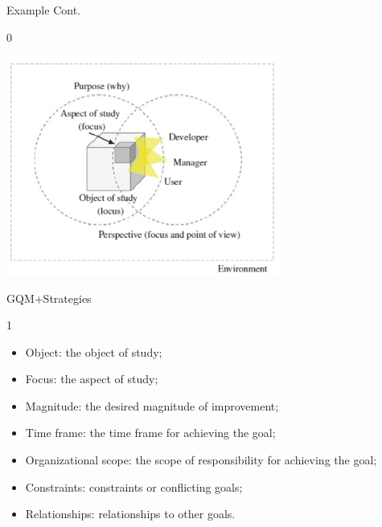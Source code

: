 \documentclass{beamer}
\begin{document}
\begin{frame}{\centerline{Example Cont.}}
0

\begin{center}
\includegraphics[width=90mm]{A2022.IDSEPC.SperimentazioneDeduzione/image-05.png}
\end{center}
\end{frame}

\begin{frame}{\centerline{GQM+Strategies}}
1

\begin{itemize}

\item  Object: the object of study;
\item  Focus: the aspect of study;
\item  Magnitude: the desired magnitude of improvement;
\item  Time frame: the time frame for achieving the goal;
\item  Organizational scope: the scope of responsibility for achieving the goal;
\item  Constraints: constraints or conflicting goals;
\item  Relationships: relationships to other goals.

\end{itemize}




\end{frame}
\end{document}
